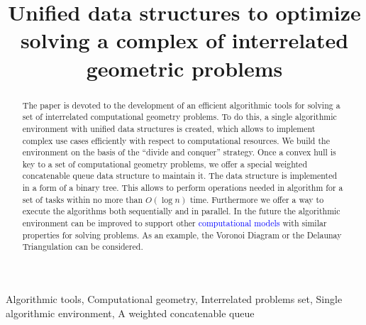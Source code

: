 \documentclass[conference]{IEEEtran}
\theoremstyle{plane}
\begin{document}
\title{Unified data structures to optimize solving a complex of interrelated geometric problems\\
}
\author{
\and
{}
}
\maketitle

\begin{abstract}
The paper is devoted to the development of an efficient algorithmic tools for solving a set of interrelated computational geometry problems. To do this, a single algorithmic environment with unified data structures is created, which allows to implement complex use cases efficiently with respect to computational resources. We build the environment on the basis of the ``divide and conquer'' strategy. 
Once a convex hull is key to a set of computational geometry problems, we offer a special weighted concatenable queue data structure to maintain it. The data structure is implemented in a form of a binary tree. This allows to perform operations needed in algorithm for a set of tasks within no more than $O(\log n)$ time. Furthermore we offer a way to execute the algorithms both sequentially and in parallel.
In the future the algorithmic environment can be improved to support other \textcolor{blue}{computational models} with similar properties for solving problems. As an example, the Voronoi Diagram or the Delaunay Triangulation can be considered.
\end{abstract}

\begin{IEEEkeywords}
Algorithmic tools,   Computational geometry, Interrelated problems set, Single algorithmic environment, A weighted concatenable queue
\end{IEEEkeywords}
\end{document}
